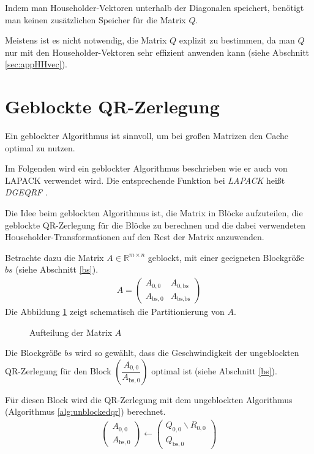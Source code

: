 Indem man Householder-Vektoren unterhalb der Diagonalen speichert, benötigt man keinen zusätzlichen Speicher für die Matrix $Q$.

Meistens ist es nicht notwendig, die Matrix $Q$ explizit zu bestimmen, da man $Q$ nur mit den Householder-Vektoren sehr effizient anwenden kann (siehe Abschnitt \ref{sec:appHHvec}).



\newpage
\section{Geblockte QR-Zerlegung}
Ein geblockter Algorithmus ist sinnvoll, um bei großen Matrizen den Cache optimal zu nutzen.

Im Folgenden wird ein geblockter Algorithmus beschrieben wie er auch von LAPACK verwendet wird. Die entsprechende Funktion bei \textit{LAPACK} heißt \textit{DGEQRF} \cite{DGEQRF}.

Die Idee beim geblockten Algorithmus ist, die Matrix in Blöcke aufzuteilen, die geblockte QR-Zerlegung für die Blöcke zu berechnen und die dabei verwendeten Householder-Transformationen auf den Rest der Matrix anzuwenden.

Betrachte dazu die Matrix $A \in \mathbb{R}^{m \times n}$ geblockt, mit einer geeigneten Blockgröße $bs$ (siehe Abschnitt \ref{bs}).
\begin{align}
	A = \left(\begin{array}{l|l}
	A_{0, 0} & A_{0, \text{bs}} \\ \hline
	A_{\text{bs}, 0}   & A_{\text{bs}, \text{bs}} 	
	\end{array} \right) \label{equ:blockA}
\end{align}
Die Abbildung \ref{fig:blockA} zeigt schematisch die Partitionierung von $A$.

\begin{figure}[H]
	\centering
	
	\caption{Aufteilung der Matrix $A$}
	\label{fig:blockA}
\end{figure}

Die Blockgröße $bs$ wird so gewählt, dass die Geschwindigkeit der ungeblockten QR-Zerlegung für den Block $ \left(\dfrac{A_{0, 0}}{A_{\text{bs}, 0}} \right)$ optimal ist (siehe Abschnitt \ref{bs}).

Für diesen Block wird die  QR-Zerlegung mit dem ungeblockten Algorithmus (Algorithmus \ref{alg:unblockedqr}) berechnet.
\begin{align}
	\left(\begin{array}{l} 
	A_{0, 0} \\ \hline
	A_{\text{bs}, 0}
	\end{array}\right)
	\leftarrow
	\left(\begin{array}{l} 
	Q_{0, 0}  \backslash R_{0,0} \\ \hline
	Q_{\text{bs}, 0} 
	\end{array}\right)
\end{align}

